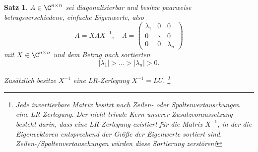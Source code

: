 \documentclass[
]{mycourse}
\theoremstyle{mythm}
\newtheorem{theorem}{Satz}[chapter]
\theoremstyle{break}
\begin{document}
\begin{theorem}\label{satz:QR}
$A\in \C^{n\times n}$ sei diagonalisierbar und besitze paarweise betragsverschiedene, einfache Eigenwerte, also
\[
A=X \Lambda X^{-1}, \quad \Lambda=\begin{pmatrix} \lambda_1 & 0 & 0\\ 0 & \ddots & 0\\ 0 & 0 & \lambda_n\end{pmatrix}
\]
mit
$X\in \C^{n\times n}$ und dem Betrag nach sortierten 
\[
|\lambda_1|>\ldots>|\lambda_n| >0.
\]

Zusätzlich besitze $X^{-1}$ eine LR-Zerlegung $X^{-1}=LU$.
\footnote{
Jede invertierbare Matrix besitzt nach Zeilen- oder Spaltenvertauschungen eine LR-Zerlegung. 
Der nicht-trivale Kern unserer Zusatzvoraussetzung besteht darin, dass eine LR-Zerlegung existiert für die Matrix $X^{-1}$, in der die Eigenvektoren entsprechend der Größe der Eigenwerte sortiert sind. Zeilen-/Spaltenvertauschungen würden diese Sortierung zerstören!}
\end{theorem}
\end{document}
